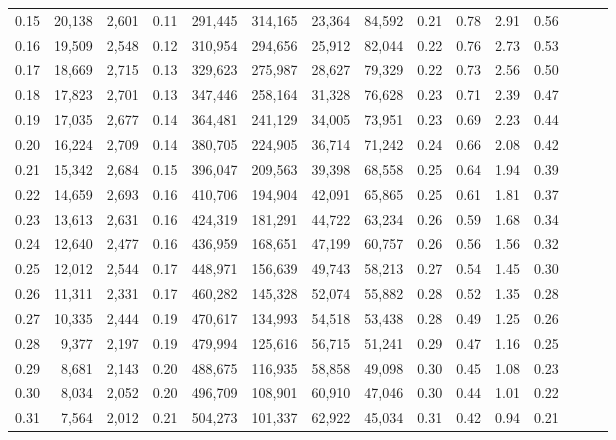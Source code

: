 \begin{tabular}{rrrrrrrrrrrrrrr}
0.15 &  20,138 &  2,601 &  0.11 &  291,445 &  314,165 &   23,364 &   84,592 &  0.21 &  0.78 &  2.91 &      0.56 \\
0.16 &  19,509 &  2,548 &  0.12 &  310,954 &  294,656 &   25,912 &   82,044 &  0.22 &  0.76 &  2.73 &      0.53 \\
0.17 &  18,669 &  2,715 &  0.13 &  329,623 &  275,987 &   28,627 &   79,329 &  0.22 &  0.73 &  2.56 &      0.50 \\
0.18 &  17,823 &  2,701 &  0.13 &  347,446 &  258,164 &   31,328 &   76,628 &  0.23 &  0.71 &  2.39 &      0.47 \\
0.19 &  17,035 &  2,677 &  0.14 &  364,481 &  241,129 &   34,005 &   73,951 &  0.23 &  0.69 &  2.23 &      0.44 \\
0.20 &  16,224 &  2,709 &  0.14 &  380,705 &  224,905 &   36,714 &   71,242 &  0.24 &  0.66 &  2.08 &      0.42 \\
0.21 &  15,342 &  2,684 &  0.15 &  396,047 &  209,563 &   39,398 &   68,558 &  0.25 &  0.64 &  1.94 &      0.39 \\
0.22 &  14,659 &  2,693 &  0.16 &  410,706 &  194,904 &   42,091 &   65,865 &  0.25 &  0.61 &  1.81 &      0.37 \\
0.23 &  13,613 &  2,631 &  0.16 &  424,319 &  181,291 &   44,722 &   63,234 &  0.26 &  0.59 &  1.68 &      0.34 \\
0.24 &  12,640 &  2,477 &  0.16 &  436,959 &  168,651 &   47,199 &   60,757 &  0.26 &  0.56 &  1.56 &      0.32 \\
0.25 &  12,012 &  2,544 &  0.17 &  448,971 &  156,639 &   49,743 &   58,213 &  0.27 &  0.54 &  1.45 &      0.30 \\
0.26 &  11,311 &  2,331 &  0.17 &  460,282 &  145,328 &   52,074 &   55,882 &  0.28 &  0.52 &  1.35 &      0.28 \\
0.27 &  10,335 &  2,444 &  0.19 &  470,617 &  134,993 &   54,518 &   53,438 &  0.28 &  0.49 &  1.25 &      0.26 \\
0.28 &   9,377 &  2,197 &  0.19 &  479,994 &  125,616 &   56,715 &   51,241 &  0.29 &  0.47 &  1.16 &      0.25 \\
0.29 &   8,681 &  2,143 &  0.20 &  488,675 &  116,935 &   58,858 &   49,098 &  0.30 &  0.45 &  1.08 &      0.23 \\
0.30 &   8,034 &  2,052 &  0.20 &  496,709 &  108,901 &   60,910 &   47,046 &  0.30 &  0.44 &  1.01 &      0.22 \\
0.31 &   7,564 &  2,012 &  0.21 &  504,273 &  101,337 &   62,922 &   45,034 &  0.31 &  0.42 &  0.94 &      0.21 \\

\end{tabular}
